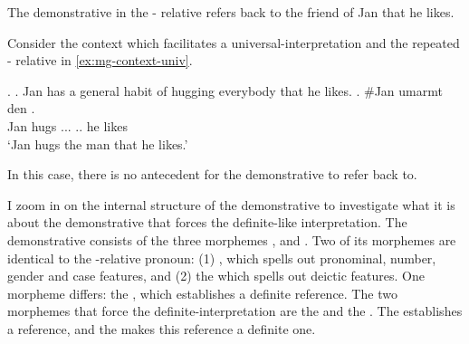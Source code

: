 The demonstrative  in the - relative refers back to the friend of Jan that he likes.

Consider the context which facilitates a universal-interpretation and the repeated - relative in \ref{ex:mg-context-univ}.

\ex.
\a. Jan has a general habit of hugging everybody that he likes.\label{ex:mg-context-univ}
\bg. \#Jan umarmt den   .\\
Jan hugs ... .. he likes\\
`Jan hugs the man that he likes.'

In this case, there is no antecedent for the demonstrative  to refer back to.


I zoom in on the internal structure of the demonstrative  to investigate what it is about the demonstrative that forces the definite-like interpretation. The demonstrative consists of the three morphemes ,  and . Two of its morphemes are identical to the -relative pronoun: (1) , which spells out pronominal, number, gender and case features, and (2) the  which spells out deictic features. One morpheme differs: the , which establishes a definite reference. The two morphemes that force the definite-interpretation are the  and the . The  establishes a reference, and the  makes this reference a definite one.


